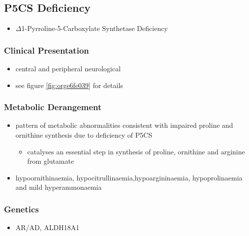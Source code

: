 \documentclass{scrartcl}
\begin{document}
\subsection{P5CS  Deficiency}
\label{sec:orgedb2db0}
\begin{itemize}
\item \(\Delta\)1-Pyrroline-5-Carboxylate Synthetase Deficiency
\end{itemize}
\subsubsection{Clinical Presentation}
\label{sec:org13ba150}
\begin{itemize}
\item central and peripheral neurological
\item see figure \ref{fig:orge6fe039} for details
\end{itemize}

\subsubsection{Metabolic Derangement}
\label{sec:org5337874}
\begin{itemize}
\item pattern of metabolic abnormalities consistent with impaired proline
and ornithine synthesis due to deficiency of P5CS
\begin{itemize}
\item catalyses an essential step in synthesis of proline, ornithine and
arginine from glutamate
\end{itemize}
\item hypoornithinaemia, hypocitrullinaemia,hypoargininaemia,
hypoprolinaemia and mild hyperammonaemia
\end{itemize}

\subsubsection{Genetics}
\label{sec:orga1cd336}
\begin{itemize}
\item AR/AD, ALDH18A1
\end{itemize}
\end{document}
